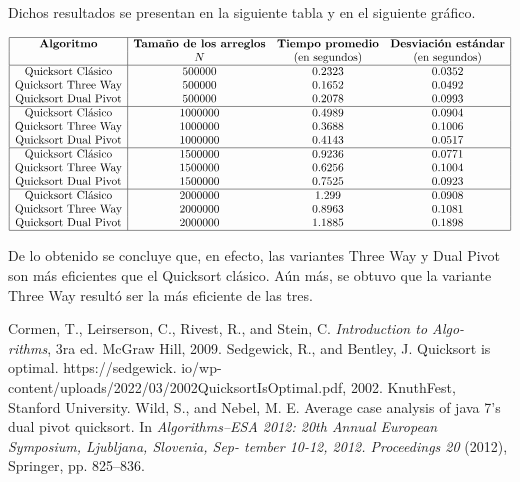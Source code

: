 \documentclass{article}
\begin{document}
	Dichos resultados se presentan en la siguiente tabla y en el siguiente gr\'afico. 

	$$\begin{array}{|c|ccc|}
		\hline
		\textbf{Algoritmo} & \textbf{Tamaño de los arreglos} &
		\textbf{Tiempo promedio} & \textbf{Desviación estándar}\\
		 & N & \text{(en segundos)} & \text{(en segundos)}\\
		\hline
		\text{Quicksort Cl\'asico} & 500000 & 0.2323 & 0.0352\\
		\text{Quicksort Three Way} & 500000 & 0.1652 & 0.0492\\
		\text{Quicksort Dual Pivot} & 500000 & 0.2078 & 0.0993\\
		\hline
		\text{Quicksort Cl\'asico} & 1000000 & 0.4989 & 0.0904\\
		\text{Quicksort Three Way} & 1000000 & 0.3688 & 0.1006\\
		\text{Quicksort Dual Pivot} & 1000000 & 0.4143 & 0.0517\\
		\hline
		\text{Quicksort Cl\'asico} & 1500000 & 0.9236 & 0.0771\\
		\text{Quicksort Three Way} & 1500000 & 0.6256 & 0.1004\\
		\text{Quicksort Dual Pivot} & 1500000 & 0.7525 & 0.0923\\
		\hline
		\text{Quicksort Cl\'asico} & 2000000 & 1.299 & 0.0908\\
		\text{Quicksort Three Way} & 2000000 & 0.8963 & 0.1081\\
		\text{Quicksort Dual Pivot} & 2000000 & 1.1885 & 0.1898\\
		\hline
	\end{array}$$\:
	
	De lo obtenido se concluye que, en efecto, las variantes Three Way y Dual Pivot son m\'as eficientes que el Quicksort cl\'asico. A\'un m\'as, se obtuvo que la variante Three Way result\'o ser la m\'as eficiente de las tres. 

	
	\begin{thebibliography}{}
		 Cormen, T., Leirserson, C., Rivest, R., and Stein, C. \textit{Introduction to Algo-
		rithms}, 3ra ed. McGraw Hill, 2009.
		 Sedgewick, R., and Bentley, J. Quicksort is optimal. https://sedgewick.
		io/wp-content/uploads/2022/03/2002QuicksortIsOptimal.pdf, 2002. KnuthFest,
		Stanford University.
		 Wild, S., and Nebel, M. E. Average case analysis of java 7’s dual pivot quicksort.
		In \textit{Algorithms–ESA 2012: 20th Annual European Symposium, Ljubljana, Slovenia, Sep-
		tember 10-12, 2012. Proceedings 20} (2012), Springer, pp. 825–836.
	\end{thebibliography}
	
\end{document}
